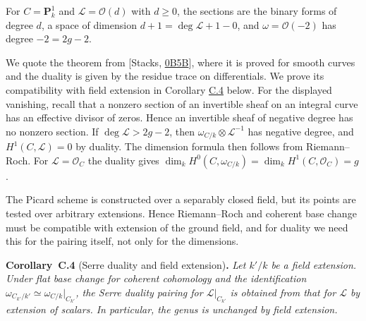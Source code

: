\documentclass[11pt]{article}
\newenvironment{bpstatement}[2]{\par\addvspace{0.6\baselineskip}\noindent\textbf{#1}#2\textbf{.}\enspace\ignorespaces}
  {\par\addvspace{0.4\baselineskip}}
\newenvironment{bpstatementit}[2]{\begin{bpstatement}{#1}{#2}\itshape\ignorespaces}{\end{bpstatement}}
\begin{document}
\label{bp131}%
For \(C=\mathbf P^1_k\) and \(\mathcal L=\mathcal O(d)\) with \(d\geq0\), the sections are the binary forms of degree \(d\), a space of dimension \(d+1=\deg\mathcal L+1-0\), and \(\omega=\mathcal O(-2)\) has degree \(-2=2g-2\).

We quote the theorem from [Stacks, \href{https://stacks.math.columbia.edu/tag/0B5B}{0B5B}], where it is proved for smooth curves and the duality is given by the residue trace on differentials. We prove its compatibility with field extension in Corollary \hyperref[bp132]{C.4} below. For the displayed vanishing, recall that a nonzero section of an invertible sheaf on an integral curve has an effective divisor of zeros. Hence an invertible sheaf of negative degree has no nonzero section. If \(\deg\mathcal L>2g-2\), then \(\omega_{C/k}\otimes\mathcal L^{-1}\) has negative degree, and \(H^1(C,\mathcal L)=0\) by duality. The dimension formula then follows from Riemann–Roch. For \(\mathcal L=\mathcal O_C\) the duality gives \(\dim_kH^0(C,\omega_{C/k})=\dim_kH^1(C,\mathcal O_C)=g\).

The Picard scheme is constructed over a separably closed field, but its points are tested over arbitrary extensions. Hence Riemann–Roch and coherent base change must be compatible with extension of the ground field, and for duality we need this for the pairing itself, not only for the dimensions.

\label{bp132}%
\begin{bpstatementit}{Corollary~C.4}{ (Serre duality and field extension)}
Let \(k'/k\) be a field extension. Under flat base change for coherent cohomology and the identification \(\omega_{C_{k'}/k'}\simeq\omega_{C/k}|_{C_{k'}}\), the Serre duality pairing for \(\mathcal L|_{C_{k'}}\) is obtained from that for \(\mathcal L\) by extension of scalars. In particular, the genus is unchanged by field extension.
\end{bpstatementit}
\end{document}
